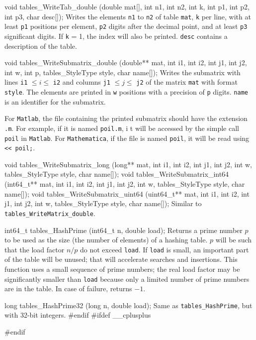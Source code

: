 {void tables_WriteTab_double (double mat[], int n1, int n2, int k, 
                             int p1, int p2, int p3, char desc[]);
\endcode
 \tab  Writes the elements {\tt n1} to {\tt n2} of table {\tt mat},
  {\tt k} per line, with at least {\tt p1} positions per element,
  {\tt p2} digits after the decimal point, and at least  {\tt p3} significant digits.
   If {\tt k} = 1, the index
  will also be printed. {\tt desc} contains a description of the table.
 \endtab\code

void tables_WriteSubmatrix_double (double** mat, int i1, int i2, int j1, int j2,
                             int w, int p, tables_StyleType style, char name[]);
\endcode
 \tab Writes the submatrix with lines 
   {\tt i1} $\le i \le $ {\tt i2} and columns 
   {\tt j1} $\le j \le $ {\tt j2} of the matrix {\tt mat} with format
   {\tt style}. The elements are printed in {\tt w}
   positions with a precision of {\tt p} digits. {\tt name} is
   an identifier for the submatrix.
  
   For {\tt Matlab}, the file containing the printed submatrix should have 
	 the extension {\tt .m}.
   For example, if it is named {\tt poil.m}, i t will be accessed by the
   simple call {\tt poil} in {\tt Matlab}.
   For {\tt Mathematica}, if the file is named {\tt poil},
   it will be read using {\tt << poil;}.
 \endtab
\code

void tables_WriteSubmatrix_long (long** mat, int i1, int i2, int j1, int j2, 
                                 int w, tables_StyleType style, char name[]);
void tables_WriteSubmatrix_int64 (int64_t** mat, int i1, int i2, int j1, int j2,
                                  int w, tables_StyleType style, char name[]);
void tables_WriteSubmatrix_uint64 (uint64_t** mat, int i1, int i2, int j1, 
                           int j2, int w, tables_StyleType style, char name[]);
\endcode
 \tab Similar to {\tt tables\_WriteMatrix\_double}.
 \endtab
\code

int64_t tables_HashPrime (int64_t n, double load);
\endcode
  \tab Returns a prime number $p$ to be used as the size 
   (the number of elements) of a hashing table.
   $p$ will be such that the load factor $n/p$ do not exceed {\tt load}.
   If {\tt load} is small, an important part of the table will be unused; that
   will accelerate searches and insertions.
   This function uses a small sequence of prime numbers; the real load factor
   may be significantly smaller than {\tt load} because only a limited
   number of prime numbers are in the table. In case of failure, returns $-1$.
 \endtab
\code

long tables_HashPrime32 (long n, double load);
\endcode
  \tab Same as \texttt{tables\_HashPrime}, but with 32-bit integers.
 \endtab
\code\hide
#endif
#ifdef __cplusplus
}
#endif
\endhide
\endcode
